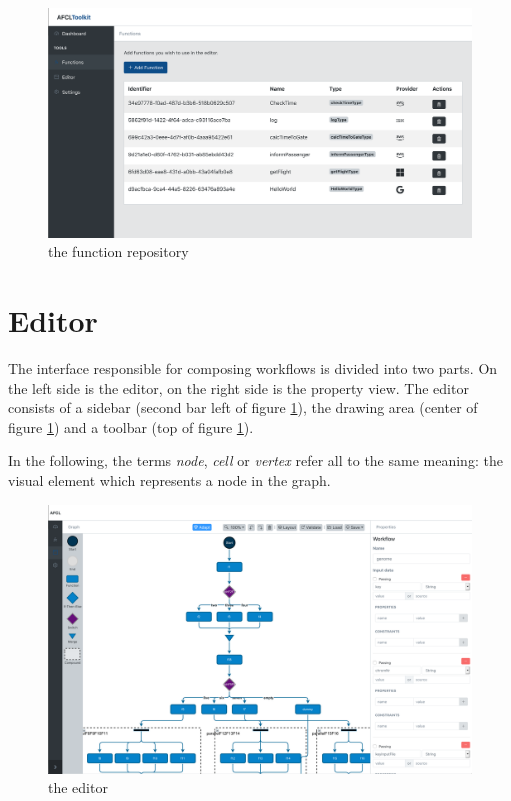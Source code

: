 \documentclass[a4paper,top=25mm,bottom=25mm,12pt,pdftex,halfparskip,twoside,bibtotoc,numbers=noenddot]{scrbook}
\begin{document}
\begin{figure}[H]
  \centering
  \includegraphics[width=\textwidth]{functions}
  \caption{the function repository}
\end{figure}

\section{Editor}
The interface responsible for composing workflows is divided into two parts. On the left side is the editor, on the right side is the property view. The editor consists of a sidebar (second bar left of figure \ref{fig:editor}), the drawing area (center of figure \ref{fig:editor}) and a toolbar (top of figure \ref{fig:editor}).

In the following, the terms \textit{node}, \textit{cell} or \textit{vertex} refer all to the same meaning: the visual element which represents a node in the graph.

\begin{figure}[H]
  \centering
  \includegraphics[width=\textwidth]{editor}
  \caption{the editor}
  \label{fig:editor}
\end{figure}
\end{document}
